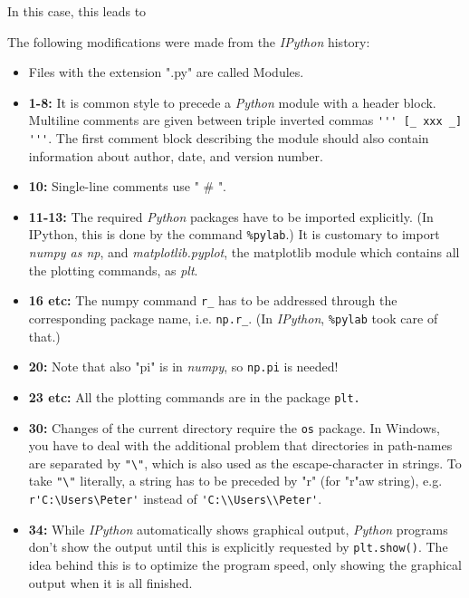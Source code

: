 In this case, this leads to



The following modifications were made from the \emph{IPython} history:

\begin{itemize}
  \item Files with the extension ".py" are called Modules.

  \item \textbf{1-8:} It is common style to precede a \emph{Python} module with a header block. Multiline comments are given between triple inverted commas \lstinline{''' [_ xxx _] '''}. The first comment block describing the module should also contain information about author, date, and version number.

  \item \textbf{10:}  Single-line comments use " \# ".

  \item \textbf{11-13:} The required \emph{Python} packages have to be imported explicitly. (In IPython, this is done by the command \lstinline{%pylab}.) It is customary to import \emph{numpy as np}, and \emph{matplotlib.pyplot}, the matplotlib module which contains all the plotting commands, as \emph{plt}.

  \item \textbf{16 etc:} The numpy command \lstinline{r_} has to be addressed through the corresponding package name, i.e. \lstinline{np.r_}. (In \emph{IPython}, \lstinline{%pylab} took care of that.)

  \item \textbf{20:}  Note that also "pi" is in \emph{numpy}, so \lstinline{np.pi} is needed!

  \item \textbf{23 etc:}  All the plotting commands are in the package \lstinline{plt.}

  \item \textbf{30:} Changes of the current directory require the \lstinline{os} package. In Windows, you have to deal with the additional problem that directories in path-names are separated by \lstinline{"\"}, which is also used as the escape-character in strings. To take \lstinline{"\"} literally, a string has to be preceded by "r" (for "r"aw string), e.g. \lstinline{r'C:\Users\Peter'} instead of \lstinline{'C:\\Users\\Peter'}.

  \item \textbf{34:} While \emph{IPython} automatically shows graphical output, \emph{Python} programs don't show the output until this is explicitly requested by \lstinline{plt.show()}. The idea behind this is to optimize the program speed, only showing the graphical output when it is all finished.
\end{itemize}

